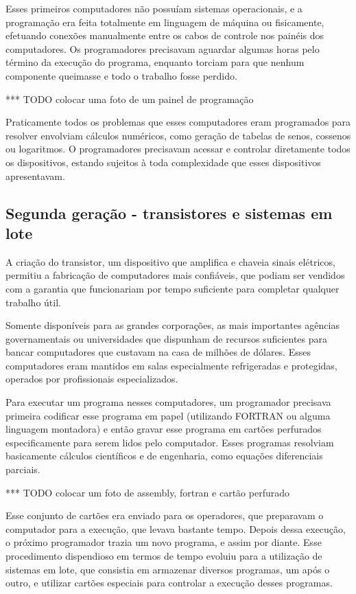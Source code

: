 \documentclass[11pt,twoside,a4paper]{book}
\begin{document}
Esses primeiros computadores não possuíam sistemas operacionais, e a programação era feita totalmente em linguagem de máquina ou fisicamente, efetuando conexões manualmente entre os cabos de controle nos painéis dos computadores. Os programadores precisavam aguardar algumas horas pelo término da execução do programa, enquanto torciam para que nenhum componente queimasse e todo o trabalho fosse perdido. 

*** TODO colocar uma foto de um painel de programação

Praticamente todos os problemas que esses computadores eram programados para resolver envolviam cálculos numéricos, como geração de tabelas de senos, cossenos ou logaritmos. O programadores precisavam acessar e controlar diretamente todos os dispositivos, estando sujeitos à toda complexidade que esses dispositivos apresentavam. 

\subsection*{Segunda geração - transistores e sistemas em lote}
A criação do transistor, um dispositivo que amplifica e chaveia sinais elétricos, permitiu a fabricação de computadores mais confiáveis, que podiam ser vendidos com a garantia que funcionariam por tempo suficiente para completar qualquer trabalho útil.

Somente disponíveis para as grandes corporações, as mais importantes agências governamentais ou universidades que dispunham de recursos suficientes para bancar computadores que custavam na casa de milhões de dólares. Esses computadores eram mantidos em salas especialmente refrigeradas e protegidas, operados por profissionais especializados. 

Para executar um programa nesses computadores, um programador precisava primeira codificar esse programa em papel (utilizando FORTRAN ou alguma linguagem montadora) e então gravar esse programa em cartões perfurados especificamente para serem lidos pelo computador. Esses programas resolviam basicamente cálculos científicos e de engenharia, como equações diferenciais parciais.

*** TODO colocar um foto de assembly, fortran e cartão perfurado

Esse conjunto de cartões era enviado para os operadores, que preparavam o computador para a execução, que levava bastante tempo. Depois dessa execução, o próximo programador trazia um novo programa, e assim por diante. Esse procedimento dispendioso em termos de tempo evoluiu para a utilização de sistemas em lote, que consistia em armazenar diversos programas, um após o outro, e utilizar cartões especiais para controlar a execução desses programas.
\end{document}
